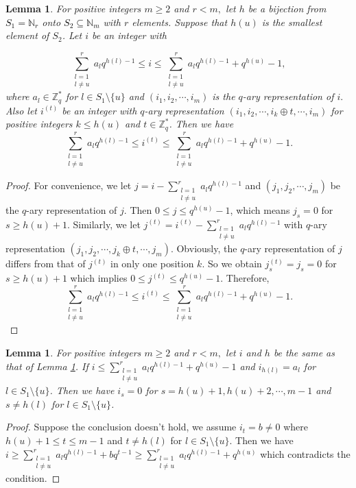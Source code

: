 \documentclass[11pt]{article}
\newcommand{\2} {$2$-to-$1$}
\newtheorem{lem}[thm]{\bfseries   Lemma}
\begin{document}
\begin{lem}\label{5}
	For positive integers $m\geq 2$ and $r<m,$ let $h$ be a bijection  from \textcolor{black}{$S_1=\mathbb{N}_r$} onto \textcolor{black}{$S_2\subseteq \mathbb{N}_m$} with $r$ elements. Suppose that $h(u)$  is the smallest element of $S_2$.
  Let $i$ be an integer with
	
	$$\sum^{r}_{\substack {l=1\\ l\neq u}}a_{l}q^{h(l)-1}\leq i\leq \sum^{r}_{\substack {l=1\\ l\neq u}}a_{l}q^{h(l)-1}+q^{h(u)}-1,$$ where $a_{l}\in \mathbb{Z}^{*}_q$ for $l\in S_1\setminus\{u\}$ and $(i_{1},i_{2},\cdots,i_{m})$ is the $q$-ary representation of $i.$ Also let $i^{(t)}$ be an integer with $q$-ary representation $(i_{1},i_{2},\cdots,i_{k}\oplus t,\cdots,i_{m})$ for positive integers $k\leq h(u)$ and $t\in \mathbb{Z}^*_{q}$. Then we have  $$\sum^{r}_{\substack {l=1\\l\neq u}}a_{l}q^{h(l)-1}\leq i^{(t)}\leq \sum^{r}_{\substack {l=1\\l\neq u}}a_{l}q^{h(l)-1}+q^{h(u)}-1.$$
\end{lem}
\begin{proof}
	For convenience, we let $j=i-\sum\limits^{r}_{\substack {l=1\\ l\neq u}}a_{l}q^{h(l)-1}$ and $(j_{1},j_{2},\cdots,j_{m})$ be the $q$-ary representation of $j.$ Then $0\leq j\leq q^{h(u)}-1$, which means $j_{s}=0$ for $s\geq h(u)+1$. Similarly, we let $j^{(t)}=i^{(t)}-\sum\limits^{r}_{\substack {l=1\\l\neq u}}a_{l}q^{h(l)-1}$ with $q$-ary representation $(j_{1},j_{2},\cdots,j_{k}\oplus t,\cdots,j_{m})$. Obviously, the $q$-ary representation of $j$ differs from that of $j^{(t)}$ in only one position $k$. So we obtain $j^{(t)}_{s}=j_{s}=0$ for $s\geq h(u)+1$ which implies $0\leq j^{(t)}\leq q^{h(u)}-1$. Therefore, $$\sum^{r}_{\substack {l=1\\ l\neq u}}a_{l}q^{h(l)-1}\leq i^{(t)}\leq \sum^{r}_{\substack {l=1\\ l\neq u}}a_{l}q^{h(l)-1}+q^{h(u)}-1.$$
	
\end{proof}

\begin{lem} \label{lem2}
	For positive integers $m\geq 2$ and $r<m,$ let $i$ and $h$ be the same as that of Lemma \ref{5}. If $i\leq \sum\limits^{r}_{\substack {l=1\\ l\neq u}}a_{l}q^{h(l)-1}+q^{h(u)}-1$ and $i_{h(l)}=a_{l}$ for $l\in S_1\setminus\{u\}$. Then we have $i_{s}=0$ for $s=h(u)+1, h(u)+2,\cdots,m-1$ and $s\neq h(l) $ for $l\in S_1\setminus\{u\}$.
\end{lem}
\begin{proof}
	Suppose the conclusion doesn't hold, we assume $i_{t}=b\neq 0$ where $h(u)+1\leq t\leq m-1$ and $t\neq h(l)$ for $l\in S_1\setminus\{u\}$. Then we have $i\geq \sum\limits^{r}_{\substack {l=1\\ l\neq u}}a_{l}q^{h(l)-1}+b
	q^{t-1}\geq \sum\limits^{r}_{\substack {l=1\\ l\neq u}}a_{l}q^{h(l)-1}+q^{h(u)}$ which contradicts the condition.
\end{proof}
\end{document}
